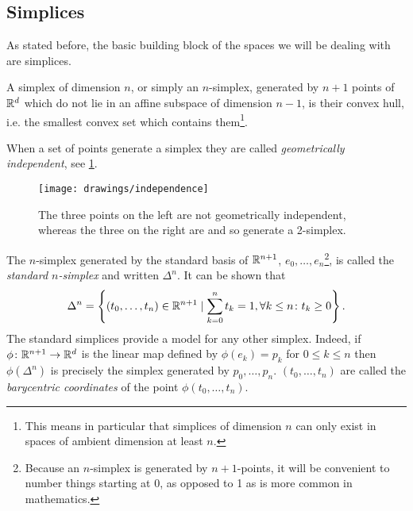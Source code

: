 \documentclass[../main.tex]{subfiles}
\begin{document}
\subsection{Simplices}
As stated before, the basic building block of the spaces we will be dealing with are
simplices. 
\begin{definition}[Simplex]\label{def:simplex}
	A simplex of dimension \( n \), or simply an \( n \)-simplex, generated by \( n+1 \)
	points of \( \mathbb{R}^d \) which do not lie in an affine subspace of dimension \( n-1
	\), is their convex hull, i.e. the smallest convex set which contains
	them\footnote{This means in particular that simplices of dimension \( n \) can only
	exist in spaces of ambient dimension at least \( n \).}.
\end{definition}
When a set of points generate a simplex they are called \emph{geometrically independent},
see \cref{fig:independence}. 

\begin{figure}[htb]
	\centering
	\texttt{[image: drawings/independence]}
	\caption{The three points on the left are not geometrically independent, whereas the
	three on the right are and so generate a 2-simplex.}
	\label{fig:independence}
\end{figure}

The \( n \)-simplex generated by the standard basis of \( \mathbb{R}^{n+1} \), \( e_0,
\dots, e_n \)\footnote{Because an \( n \)-simplex is generated by \( n+1 \)-points, it
will be convenient to number things starting at 0, as opposed to 1 as is more
common in mathematics.}, is called the \emph{standard \( n \)-simplex} and
written \( \Delta^n \). It can be shown that
\begin{equation*}
	\Delta^n = \left\{ (t_0, \dots, t_n) \in \mathbb{R}^{n+1} \mid \sum_{k = 0}^{n} t_k = 1, \forall k
	\leq n \colon t_k \geq 0 \right\}. 
\end{equation*}
The standard simplices provide a model for any other simplex. Indeed, if \( \phi \colon
\mathbb{R}^{n+1} \to \mathbb{R}^d \) is the linear map defined by \( \phi(e_k) = p_k \) for \( 0 \leq k
\leq n \) then \( \phi(\Delta^n) \) is precisely the simplex generated by \( p_0, \dots,
p_n \). \( (t_0, \dots, t_n) \) are called the \emph{barycentric coordinates} of the point
\( \phi(t_0, \dots, t_n) \). 
\end{document}
